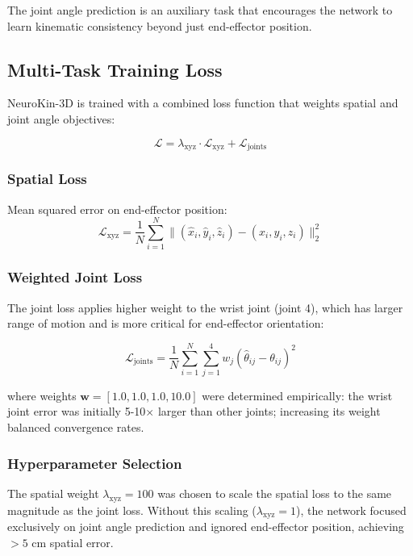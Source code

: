 \documentclass[12pt,a4paper,oneside]{report}
\begin{document}
The joint angle prediction is an auxiliary task that encourages the network to learn kinematic consistency beyond just end-effector position.

\subsection{Multi-Task Training Loss}

NeuroKin-3D is trained with a combined loss function that weights spatial and joint angle objectives:

\begin{equation}
\mathcal{L} = \lambda_{\text{xyz}} \cdot \mathcal{L}_{\text{xyz}} + \mathcal{L}_{\text{joints}}
\end{equation}

\subsubsection{Spatial Loss}

Mean squared error on end-effector position:
\begin{equation}
\mathcal{L}_{\text{xyz}} = \frac{1}{N} \sum_{i=1}^{N} \|(\hat{x}_i, \hat{y}_i, \hat{z}_i) - (x_i, y_i, z_i)\|_2^2
\end{equation}

\subsubsection{Weighted Joint Loss}

The joint loss applies higher weight to the wrist joint (joint 4), which has larger range of motion and is more critical for end-effector orientation:

\begin{equation}
\mathcal{L}_{\text{joints}} = \frac{1}{N} \sum_{i=1}^{N} \sum_{j=1}^{4} w_j (\hat{\theta}_{ij} - \theta_{ij})^2
\end{equation}

where weights $\mathbf{w} = [1.0, 1.0, 1.0, 10.0]$ were determined empirically: the wrist joint error was initially 5-10$\times$ larger than other joints; increasing its weight balanced convergence rates.

\subsubsection{Hyperparameter Selection}

The spatial weight $\lambda_{\text{xyz}} = 100$ was chosen to scale the spatial loss to the same magnitude as the joint loss. Without this scaling ($\lambda_{\text{xyz}} = 1$), the network focused exclusively on joint angle prediction and ignored end-effector position, achieving $>5$ cm spatial error.
\end{document}
